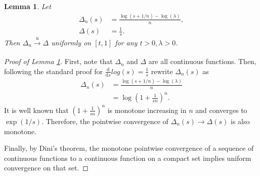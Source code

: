\documentclass[a4paper]{article}
\newtheorem{lemma}{Lemma}
\begin{document}
\begin{lemma}
    \label{lemma:log_convergence}
    Let 
    \begin{align*}
        \Delta_n(s) &= \frac{\log(s + 1/n) - \log(\lambda)}{n}, \\
        \Delta(s) &= \frac{1}{s}.
    \end{align*}
    Then $\Delta_n \xrightarrow[]{\mathrm{u}} \Delta$ uniformly on $[t, 1]$ for any $t > 0, \lambda > 0$.
\end{lemma}
\begin{proof}[Proof of Lemma \ref{lemma:log_convergence}]
    First, note that $\Delta_n$ and $\Delta$ are all continuous functions.
    Then, following the standard proof for $\frac{\mathrm{d}}{\mathrm{d}s}log(s) = \frac{1}{s}$ rewrite $\Delta_n(s)$ as
    \begin{align*}
        \Delta_n(s) &= \frac{\log(s + 1/n) - \log(\lambda)}{n} \\
        &= \log \left( 1 + \frac{1}{sn} \right) ^ n .
    \end{align*}
    It is well known that $\left( 1 + \frac{1}{sn} \right) ^ n$ is monotone increasing in $n$ and converges to $\exp (1/s)$.
    Therefore, the pointwise convergence of $\Delta_n(s) \to \Delta(s)$ is also monotone.

    Finally, by Dini's theorem, the monotone pointwise convergence of a sequence of continuous functions to a continuous function on a compact set implies uniform convergence on that set.
\end{proof}
\end{document}
